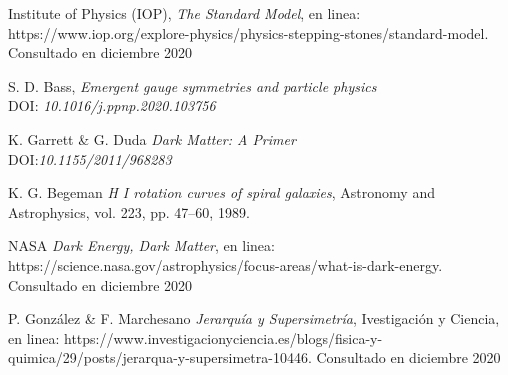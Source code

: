 \documentclass[journal]{IEEEtran}
\begin{document}
\begin{thebibliography}{1}

Institute of Physics (IOP), \emph{The Standard Model}, en linea: https://www.iop.org/explore-physics/physics-stepping-stones/standard-model. Consultado en diciembre 2020

S. D. Bass, \emph{Emergent gauge symmetries and particle physics}\\ DOI:\emph{ 10.1016/j.ppnp.2020.103756}

K. Garrett \& G. Duda \emph{Dark Matter: A Primer}\\
DOI:\emph{10.1155/2011/968283}

K. G. Begeman \emph{H I rotation curves of spiral galaxies}, Astronomy and Astrophysics, vol. 223, pp. 47–60, 1989.

NASA \emph{Dark Energy, Dark Matter}, en linea: https://science.nasa.gov/astrophysics/focus-areas/what-is-dark-energy.
Consultado en diciembre 2020

P. González \& F. Marchesano \emph{Jerarquía y Supersimetría}, Ivestigación y Ciencia, en linea: https://www.investigacionyciencia.es/blogs/fisica-y-quimica/29/posts/jerarqua-y-supersimetra-10446.
Consultado en diciembre 2020


\end{thebibliography}
\end{document}
